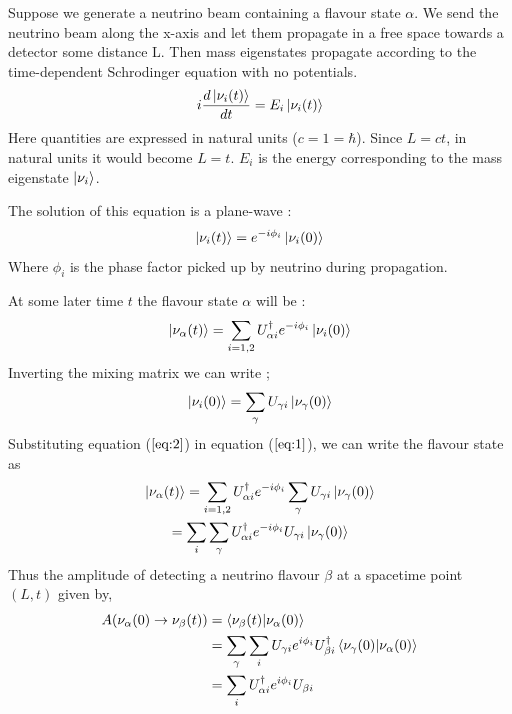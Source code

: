 \documentclass[12pt,a4paper]{report}
\begin{document}
Suppose we generate a neutrino beam containing a flavour state $\alpha$. We send the neutrino beam along the x-axis and let them propagate in a free space towards a detector some distance L. Then mass eigenstates propagate according to the time-dependent Schrodinger equation with no potentials.
\begin{equation}
i\frac{d\ket{\nu_{i}(t)}}{dt}=E_{i}\ket{\nu_{i}(t)}
\end{equation}
Here quantities are expressed in natural units ($c=1=\hbar$). Since $L=ct$, in natural units it would become $L=t$. $E_{i}$ is the energy corresponding to the mass eigenstate $\ket{\nu_{i}}$.\par
The solution of this equation is a plane-wave : 
\begin{equation}
\label{eq:0}
\ket{\nu_{i} (t)} = e^{-i\phi_{i}}\ket{\nu_{i} (0)}
\end{equation}
Where $\phi_{i}$ is the phase factor picked up by neutrino during propagation.\par
At some later time $t$ the flavour state $\alpha$ will be : 
\begin{equation}
\label{eq:1}
\ket{\nu_{\alpha}(t)} = \sum_{i=1,2} U_{\alpha i}^{\dagger} e^{-i\phi_{i}}\ket{\nu_{i}(0)}
\end{equation}
Inverting the mixing matrix we can write ;
\begin{equation}
\label{eq:2}
\ket{\nu_{i}(0)} = \sum_{\gamma} U_{\gamma i} \ket{\nu_{\gamma}(0)}
\end{equation}
Substituting equation ($\ref{eq:2}$) in equation ($\ref{eq:1}$), we can write the flavour state as 
\begin{gather*}
\ket{\nu_{\alpha} (t)} =  \sum_{i=1,2} U_{\alpha i}^{\dagger}e^{-i\phi_{i}}
\sum_{\gamma} U_{\gamma i} \ket{\nu_{\gamma}(0)}\\
 = \sum_{i}\sum_{\gamma} U_{\alpha i}^{\dagger} e^{-i\phi_{i}} U_{\gamma i} \ket{\nu_{\gamma}(0)}
\end{gather*}
Thus the amplitude of detecting a neutrino flavour $\beta$ at a spacetime point $(L,t)$ given by,
\begin{equation}
\begin{split}
A(\nu_{\alpha} (0)\rightarrow\nu_{\beta}(t))& = \braket{\nu_{\beta}(t)|\nu_{\alpha}(0)}\\
& =\sum_{\gamma}\sum_{i} U_{\gamma i}e^{i\phi_{i}}U_{\beta i}^{\dagger}\braket{\nu_{\gamma}(0)|{\nu_{\alpha}(0)}}\\
& =\sum_{i}U_{\alpha i}^{\dagger}e^{i\phi_{i}}U_{\beta i}
\end{split}
\end{equation}
\end{document}
